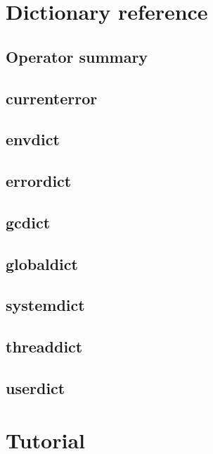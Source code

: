 \section{Dictionary reference}
\subsection{Operator summary}
\subsection{currenterror}
\subsection{envdict}
\subsection{errordict}
\subsection{gcdict}
\subsection{globaldict}
\subsection{systemdict}
\subsection{threaddict}
\subsection{userdict}

\section{Tutorial}